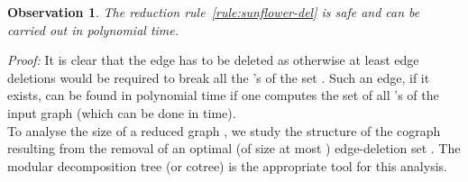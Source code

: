 \documentclass[11pt]{article}
\newenvironment{proof}{\noindent\textit{Proof: }}{{\hfill }}
\newtheorem{observation}[lemma]{Observation}
\begin{document}
\begin{observation} \label{obs:rule-del}
The reduction rule~\ref{rule:sunflower-del} is safe and can be carried out in polynomial time.
\end{observation}

\begin{proof}
It is clear that the edge  has to be deleted as otherwise at least  edge deletions would be required to break all the 's of the set . Such an edge, if it exists, can be found in polynomial time if one computes the set of all 's of the input graph (which can be done in  time).
\end{proof}\\

To analyse the size of a reduced graph , we study the structure of the cograph  resulting from the removal of an optimal (of size at most ) edge-deletion set . The modular decomposition tree (or cotree) is the appropriate tool for this analysis.

\newpage 
\end{document}
